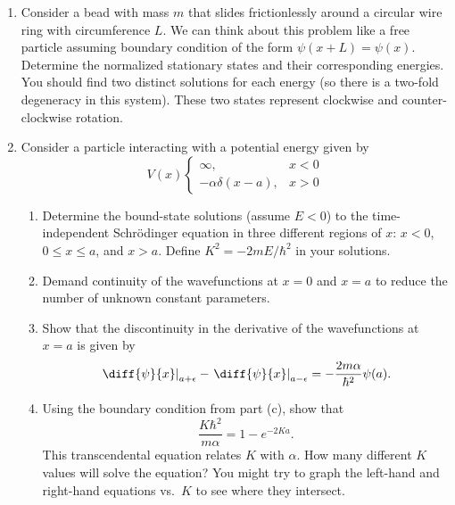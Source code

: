 \documentclass[a4paper, 12pt]{config/homework}
\begin{document}
\begin{enumerate}
\pagebreak
\item Consider a bead with mass \(m\) that slides frictionlessly around a circular wire ring with circumference \(L\). We can think about this problem like a free particle assuming boundary condition of the form \(\psi(x+L) = \psi(x)\). Determine the normalized stationary states and their corresponding energies. You should find two distinct solutions for each energy (so there is a two-fold degeneracy in this system). These two states represent clockwise and counter-clockwise rotation.



\pagebreak
\item Consider a particle interacting with a potential energy given by
\[V(x)\begin{cases}
\infty, & x < 0 \\ -\alpha\delta(x-a), & x>0
\end{cases}\]
\begin{enumerate}
\item Determine the bound-state solutions (assume \(E<0\)) to the time-independent Schr{\"o}dinger equation in three different regions of \(x\): \(x<0\), \(0 \le x \le a\), and \(x > a\). Define \(K^2=-2mE/\hbar^2\) in your solutions.



\item Demand continuity of the wavefunctions at \(x=0\) and \(x=a\) to reduce the number of unknown constant parameters.



\item Show that the discontinuity in the derivative of the wavefunctions at \(x=a\) is given by
\[\left.\diff{\psi}{x}\right|_{a+\epsilon} - \left.\diff{\psi}{x}\right|_{a-\epsilon} = - \frac{2m\alpha}{\hbar^2}\psi(a).\]


\item Using the boundary condition from part (c), show that
\[\frac{K\hbar^2}{m\alpha} = 1 - e^{-2Ka}.\]
This transcendental equation relates \(K\) with \(\alpha \). How many different \(K\) values will solve the equation? You might try to graph the left-hand and right-hand equations vs.\ \( K \) to see where they intersect.



\end{enumerate}
\end{enumerate}
\end{document}
